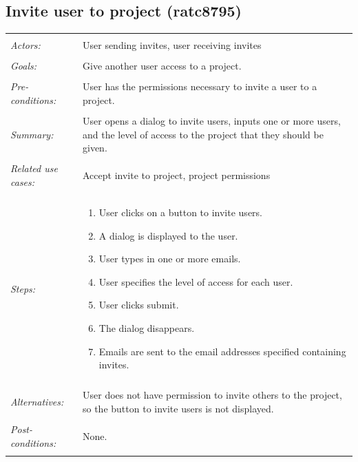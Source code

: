 \documentclass[11pt]{report}
\begin{document}
\subsection{Invite user to project (ratc8795)}
\begin{tabular}{ p{2cm} p{12cm} }
 \hline
 \\
 \textit{Actors:} & User sending invites, user receiving invites \\ 
 \\
 \textit{Goals:} & Give another user access to a project. \\
 \\
 \textit{Pre-conditions:} & User has the permissions necessary to invite a user to a project. \\
 \\
 \textit{Summary:} & User opens a dialog to invite users, inputs one or more users, and the level of access to the project that they should be given. \\ 
 \\
 \textit{Related use cases:} & Accept invite to project,  project permissions \\ 
 \\
 \textit{Steps:} & \begin{enumerate}
  \item User clicks on a button to invite users.
  \item A dialog is displayed to the user.
  \item User types in one or more emails.
  \item User specifies the level of access for each user.
  \item User clicks submit.
  \item The dialog disappears.
  \item Emails are sent to the email addresses specified containing invites.
 \end{enumerate} \\
 \\
 \textit{Alternatives:} & User does not have permission to invite others to the project, so the button to invite users is not displayed. \\
 \\
 \textit{Post-conditions:} & None. \\
 \\
\hline
\end{tabular}
\end{document}
